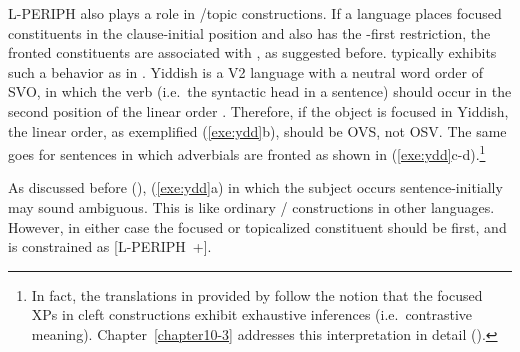 L-PERIPH also plays a role in /topic 
constructions. If a language places focused constituents
in the clause-initial position and also has the -first
restriction, the fronted constituents are
associated with , as suggested
before.  typically exhibits such a behavior as in
.  Yiddish is a V2 language with a neutral word order
of SVO, in which the verb (i.e.\ the syntactic head in a sentence)
should occur in the second position of the linear order
\citep{jacobs:05}. Therefore, if the object is focused in Yiddish, the
linear order, as exemplified (\ref{exe:ydd}b), should be OVS, not
OSV. The same goes for sentences in which adverbials are
fronted as shown in (\ref{exe:ydd}c-d).\footnote{In fact, the
  translations in  provided by \citet{jacobs:05} follow
  the notion that the focused XPs in cleft constructions exhibit
  exhaustive inferences (i.e.\ contrastive
  meaning). Chapter~\ref{chapter10-3} addresses this interpretation in
  detail ().}







\noindent As discussed before (),
(\ref{exe:ydd}a) in which the subject occurs sentence-initially may
sound ambiguous. This is like ordinary / 
constructions in other languages. However, in either case the focused
or topicalized constituent should be first, and is constrained as
\mbox{[L-PERIPH +]}.




